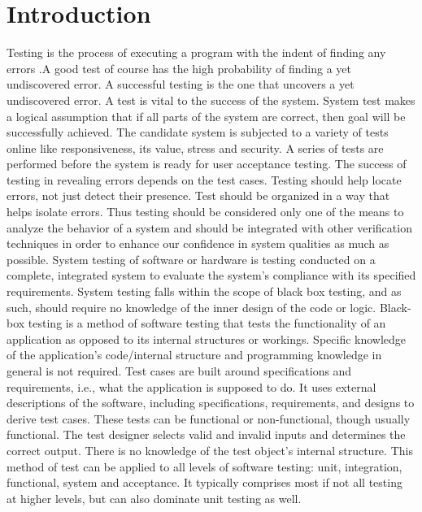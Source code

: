 \section{Introduction}
Testing is the process of executing a program with the indent of finding any errors .A good test of course has the high probability of finding a yet undiscovered error. A successful testing is the one that uncovers a yet undiscovered error. A test is vital to the success of the system. System test makes a logical assumption that if all parts of the system are correct, then goal will be successfully achieved. The candidate system is subjected to a variety of tests online like responsiveness, its value, stress and security. A series of tests are performed before the system is ready for user acceptance testing. 
\newline
The success of testing in revealing errors depends on the test cases. Testing should help locate errors, not just detect their presence. Test should be organized in a way that helps isolate errors.
\newline
Thus testing should be considered only one of the means to analyze the behavior of a system and should be integrated with other verification techniques in order to enhance our confidence in system qualities as much as possible. 
\newline
System testing of software or hardware is testing conducted on a complete, integrated system to evaluate the system’s compliance with its specified requirements. System testing falls within the scope of black box testing, and as such, should require no knowledge of the inner design of the code or logic.
\newline
Black-box testing is a method of software testing that tests the functionality of an application as opposed to its internal structures or workings. Specific knowledge of the application's code/internal structure and programming knowledge in general is not required. Test cases are built around specifications and requirements, i.e., what the application is supposed to do. It uses external descriptions of the software, including specifications, requirements, and designs to derive test cases. These tests can be functional or non-functional, though usually functional. 
\newline
 The test designer selects valid and invalid inputs and determines the correct output. There is no knowledge of the test object's internal structure. This method of test can be applied to all levels of software testing: unit, integration, functional, system and acceptance. It typically comprises most if not all testing at higher levels, but can also dominate unit testing as well.  
 
